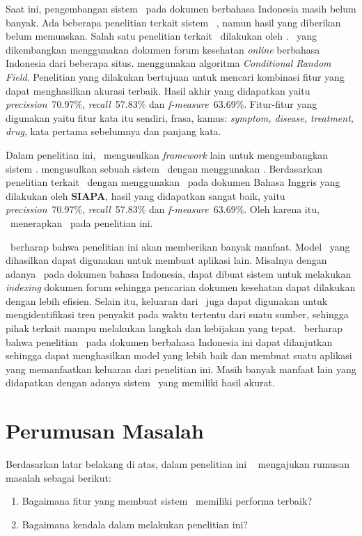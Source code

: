 	Saat ini, pengembangan sistem \mer~pada dokumen berbahasa Indonesia masih belum banyak. Ada beberapa penelitian terkait sistem \mer~, namun hasil yang diberikan belum memuaskan. Salah satu penelitian terkait \mer~dilakukan oleh \cite{skripsiKakRadit}. \mer~yang dikembangkan menggunakan dokumen forum kesehatan \textit{online} berbahasa Indonesia dari beberapa situs. \cite{skripsiKakRadit} menggunakan algoritma \textit{Conditional Random Field}. Penelitian yang dilakukan bertujuan untuk mencari kombinasi fitur yang dapat menghasilkan akurasi terbaik. Hasil akhir yang didapatkan yaitu \textit{precission}~70.97\%, \textit{recall}~57.83\% dan \textit{f-measure}~63.69\%. Fitur-fitur yang digunakan yaitu fitur kata itu sendiri, frasa, kamus: \textit{symptom, disease, treatment, drug}, kata pertama sebelumnya dan panjang kata.

	Dalam penelitian ini, \saya~mengusulkan \textit{framework} lain untuk mengembangkan sistem \mer. \Saya mengusulkan sebuah sistem \mer~dengan menggunakan \rnn. Berdasarkan penelitian terkait \mer~dengan menggunakan \rnn~pada dokumen Bahasa Inggris yang dilakukan oleh \textbf{SIAPA}, hasil yang didapatkan sangat baik, yaitu \textit{precission}~70.97\%, \textit{recall}~57.83\% dan \textit{f-measure}~63.69\%. Oleh karena itu, \saya~menerapkan \rnn~pada penelitian ini.
		
	\Saya~berharap bahwa penelitian ini akan memberikan banyak manfaat. Model \mer~yang dihasilkan dapat digunakan untuk membuat aplikasi lain. Misalnya dengan adanya \mer~pada dokumen bahasa Indonesia, dapat dibuat sistem untuk melakukan \textit{indexing} dokumen forum sehingga pencarian dokumen kesehatan dapat dilakukan dengan lebih efisien. Selain itu, keluaran dari \mer~juga dapat digunakan untuk mengidentifikasi tren penyakit pada waktu tertentu dari suatu sumber, sehingga pihak terkait mampu melakukan langkah dan kebijakan yang tepat. \Saya~berharap bahwa penelitian \mer~pada dokumen berbahasa Indonesia ini dapat dilanjutkan sehingga dapat menghasilkan model yang lebih baik dan membuat suatu aplikasi yang memanfaatkan keluaran dari penelitian ini. Masih banyak manfaat lain yang didapatkan dengan adanya sistem \mer~yang memiliki hasil akurat. 

\section{Perumusan Masalah}
Berdasarkan latar belakang di atas, dalam penelitian ini \saya~ mengajukan rumusan masalah sebagai berikut:
\begin{enumerate}
	\item Bagaimana fitur yang membuat sistem \mer~memiliki performa terbaik?
	\item Bagaimana kendala dalam melakukan penelitian ini?
\end{enumerate}

